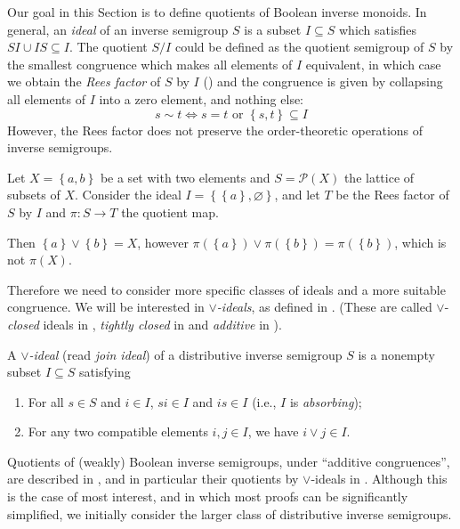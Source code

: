 Our goal in this Section is to define quotients of Boolean inverse monoids. In general, an \emph{ideal} of an inverse semigroup $S$ is a subset $I\subseteq S$ which satisfies $SI\cup IS\subseteq I$. The quotient $S/I$ could be defined as the quotient semigroup of $S$ by the smallest congruence which makes all elements of $I$ equivalent, in which case we obtain the \emph{Rees factor} of $S$ by $I$ (\cite{MR0002893}) and the congruence is given by collapsing all elements of $I$ into a zero element, and nothing else:
\[s\sim t\iff s=t\text{ or }\left\{s,t\right\}\subseteq I\]
However, the Rees factor does not preserve the order-theoretic operations of inverse semigroups.

\begin{example}
Let $X=\left\{a,b\right\}$ be a set with two elements and $S=\mathcal{P}(X)$ the lattice of subsets of $X$. Consider the ideal $I=\left\{\left\{a\right\},\varnothing\right\}$, and let $T$ be the Rees factor of $S$ by $I$ and $\pi:S\to T$ the quotient map.

Then $\left\{a\right\}\lor\left\{b\right\}=X$, however $\pi(\left\{a\right\})\lor\pi(\left\{b\right\})=\pi(\left\{b\right\})$, which is not $\pi(X)$.
\end{example}

Therefore we need to consider more specific classes of ideals and a more suitable congruence. We will be interested in \emph{$\lor$-ideals}, as defined in \cite{MR3448402}. (These are called $\lor$-\emph{closed} ideals in \cite{MR3628219,MR3519501,MR3715848}, \emph{tightly closed} in \cite{MR2974110} and \emph{additive} in \cite{MR3700423}).

\begin{definition}%
A \emph{$\lor$-ideal} (read \emph{join ideal}) of a distributive inverse semigroup $S$ is a nonempty subset $I\subseteq S$ satisfying
\begin{enumerate}
\item[(i)] For all $s\in S$ and $i\in I$, $si\in I$ and $is\in I$ (i.e., $I$ is \emph{absorbing});
\item[(ii)] For any two compatible elements $i,j\in I$, we have $i\lor j\in I$.
\end{enumerate}
\end{definition}

Quotients of (weakly) Boolean inverse semigroups, under ``additive congruences'', are described in \cite[Section 3.4]{MR3700423}, and in particular their quotients by $\lor$-ideals in \cite[Proposition 3.4.6]{MR3700423}. Although this is the case of most interest, and in which most proofs can be significantly simplified, we initially consider the larger class of distributive inverse semigroups.

